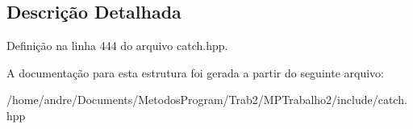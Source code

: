 \subsection{Descrição Detalhada}


Definição na linha 444 do arquivo catch.\+hpp.



A documentação para esta estrutura foi gerada a partir do seguinte arquivo\+:\begin{DoxyCompactItemize}
\item 
/home/andre/\+Documents/\+Metodos\+Program/\+Trab2/\+M\+P\+Trabalho2/include/catch.\+hpp\end{DoxyCompactItemize}
